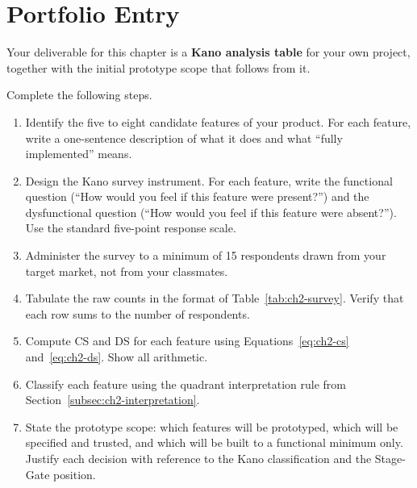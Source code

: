 \section*{Portfolio Entry}
\label{sec:ch2-artifact}

Your deliverable for this chapter is a \textbf{Kano analysis table} for
your own project, together with the initial prototype scope that follows
from it.

Complete the following steps.

\begin{enumerate}
  \item Identify the five to eight candidate features of your product.
        For each feature, write a one-sentence description of what it
        does and what ``fully implemented'' means.

  \item Design the Kano survey instrument.
        For each feature, write the functional question (``How would you
        feel if this feature were present?'') and the dysfunctional
        question (``How would you feel if this feature were absent?'').
        Use the standard five-point response scale.

  \item Administer the survey to a minimum of 15 respondents drawn from
        your target market, not from your classmates.

  \item Tabulate the raw counts in the format of
        Table~\ref{tab:ch2-survey}.
        Verify that each row sums to the number of respondents.

  \item Compute CS and DS for each feature using
        Equations~\ref{eq:ch2-cs} and~\ref{eq:ch2-ds}.
        Show all arithmetic.

  \item Classify each feature using the quadrant interpretation rule from
        Section~\ref{subsec:ch2-interpretation}.

  \item State the prototype scope: which features will be prototyped,
        which will be specified and trusted, and which will be built to a
        functional minimum only.
        Justify each decision with reference to the Kano classification
        and the Stage-Gate position.
\end{enumerate}

